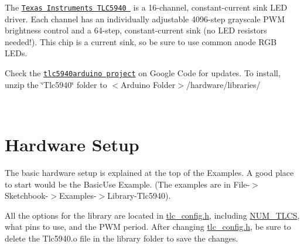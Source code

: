 The \href{http://www.ti.com/lit/gpn/TLC5940}{\tt Texas Instruments T\+L\+C5940 } is a 16-\/channel, constant-\/current sink L\+ED driver. Each channel has an individually adjustable 4096-\/step grayscale P\+WM brightness control and a 64-\/step, constant-\/current sink (no L\+ED resistors needed!). This chip is a current sink, so be sure to use common anode R\+GB L\+E\+Ds.

Check the \href{http://code.google.com/p/tlc5940arduino/}{\tt tlc5940arduino project} on Google Code for updates. To install, unzip the \char`\"{}\+Tlc5940\char`\"{} folder to $<$Arduino Folder$>$/hardware/libraries/

~\hypertarget{index_hardwaresetup}{}\section{Hardware Setup}\label{index_hardwaresetup}
The basic hardware setup is explained at the top of the Examples. A good place to start would be the Basic\+Use Example. (The examples are in File-\/$>$Sketchbook-\/$>$Examples-\/$>$Library-\/\+Tlc5940).

All the options for the library are located in \hyperlink{tlc__config_8h}{tlc\+\_\+config.\+h}, including \hyperlink{tlc__config_8h_aa673c2d8e04c9cca25f51d6c2b516b8f}{N\+U\+M\+\_\+\+T\+L\+CS}, what pins to use, and the P\+WM period. After changing \hyperlink{tlc__config_8h}{tlc\+\_\+config.\+h}, be sure to delete the Tlc5940.\+o file in the library folder to save the changes.

